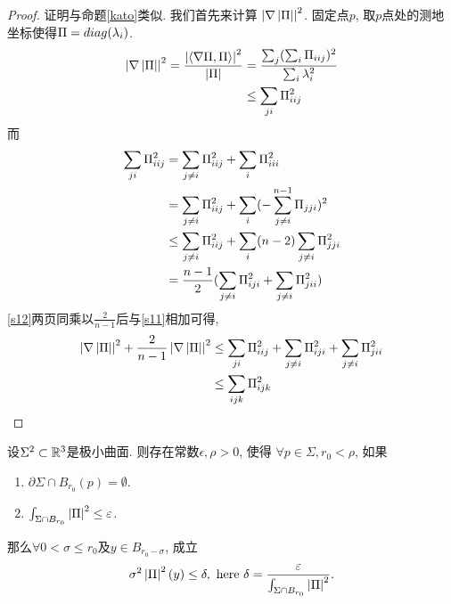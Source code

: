\begin{proof}
    证明与命题\eqref{kato}类似. 我们首先来计算 $\left | \nabla \left | {\Pi} \right | \right |^2$. 固定点$p$, 取$p$点处的测地坐标使得${\Pi}=diag(\lambda_i)$.
    \begin{equation} \label{s11}
        \begin{split}
            \left | \nabla \left | {\Pi} \right | \right |^2 = \frac{\left | {\left < \nabla {\Pi}, {\Pi} \right >} \right |^2}{\left | {\Pi} \right |} &= \frac{\sum_j(\sum_i{\Pi}_{iij})^2}{\sum_i\lambda_i^2} \\
            &\le \sum_{ji}{\Pi}_{iij}^2
        \end{split}
    \end{equation}
    而
    \begin{equation} \label{s12}
        \begin{split}
            \sum_{ji}{\Pi}_{iij}^2 &= \sum_{j\ne i}{\Pi}_{iij}^2+ \sum_{i}{\Pi}_{iii}^2 \\
            &= \sum_{j\ne i}{\Pi}_{iij}^2+ \sum_{i}(-\sum^{n-1}_{j \ne i}{\Pi}_{jji})^2\\
            &\le \sum_{j\ne i}{\Pi}_{iij}^2+ \sum_{i}(n-2)\sum_{j\ne i}{\Pi}_{jji}^2\\
            &= \frac{n-1}{2}(\sum_{j\ne i}{\Pi}_{iji}^2 +\sum_{j\ne i}{\Pi}_{jii}^2)
        \end{split}
    \end{equation}
    \eqref{s12}两页同乘以$\frac{2}{n-1}$后与\eqref{s11}相加可得,
    \begin{equation}
        \begin{split}
            \left | \nabla \left | {\Pi} \right | \right |^2+\frac{2}{n-1} \left | \nabla \left | {\Pi} \right | \right |^2 &\le \sum_{ji}{\Pi}_{iij}^2 + \sum_{j\ne i}{\Pi}_{iji}^2 +\sum_{j\ne i}{\Pi}_{jii}^2 \\
            &\le \sum_{ijk}{\Pi}^2_{ijk}
        \end{split}
    \end{equation}
\end{proof}
\begin{theorem}\label{choi_schoen}
    设$\Sigma^2 \subset \mathbb{R}^3$是极小曲面.  则存在常数$\epsilon, \rho>0$, 使得 $\forall p \in \Sigma, r_0 < \rho$, 如果
    \begin{enumerate}
        \item $\partial \Sigma \cap B_{r_0}(p)=\emptyset$.
        \item $\int_{\Sigma \cap B_{r_0}} \left | {\Pi} \right |^2\le \varepsilon$.
    \end{enumerate}
    那么$\forall  0 < \sigma \le r_0$及$y \in B_{r_0-\sigma}$, 成立
    \begin{equation}
        \sigma^2 \left | {\Pi} \right |^2(y) \le \delta, \text{ here }\delta= \frac{\varepsilon}{\int_{\Sigma \cap B_{r_0}}\left | {\Pi} \right |^2}.
    \end{equation}
\end{theorem}
